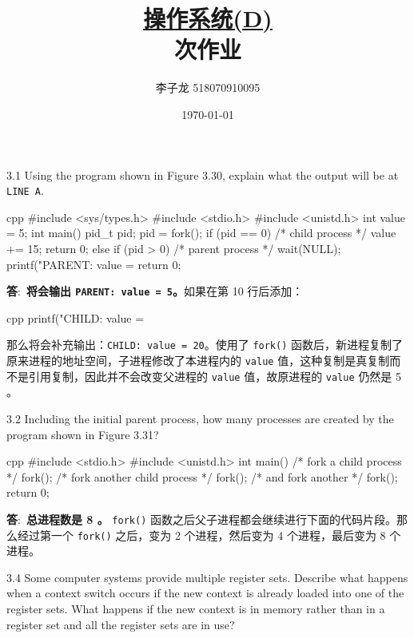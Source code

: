 \documentclass[12pt,a4paper]{article}
\newenvironment{problems}{\begin{list}{}{\renewcommand{\makelabel}[1]{\textbf{##1}\hfil}}}{\end{list}}
\providecommand{\ans}{\textbf{答}:~}
\begin{document}
\title{\normalsize \underline{操作系统(D)}\\ 次作业}
\author{李子龙 518070910095}
\date{\today}
\maketitle

\begin{problems}
    \item[3.1] Using the program shown in Figure 3.30, explain what the output will
    be at \texttt{LINE A}.
    \begin{code}{cpp}
#include <sys/types.h>
#include <stdio.h>
#include <unistd.h>
int value = 5;
int main()
{
    pid_t pid;
    pid = fork();
    if (pid == 0) { /* child process */
        value += 15;
        return 0;
    }
    else if (pid > 0) { /* parent process */
        wait(NULL);
        printf("PARENT: value = %
        return 0;
    }
}
    \end{code}

    \ans \textbf{将会输出 \texttt{PARENT: value = 5}。}如果在第 10 行后添加：
\begin{code}{cpp}
    printf("CHILD: value = %
\end{code}
    那么将会补充输出：\texttt{CHILD: value = 20}。使用了 \texttt{fork()} 函数后，新进程复制了原来进程的地址空间，子进程修改了本进程内的 \texttt{value} 值，这种复制是真复制而不是引用复制，因此并不会改变父进程的 \texttt{value} 值，故原进程的 \texttt{value} 仍然是 5 。
    \item[3.2] Including the initial parent process, how many processes are created by
    the program shown in Figure 3.31?
    \begin{code}{cpp}
#include <stdio.h>
#include <unistd.h>
int main()
{
    /* fork a child process */
    fork();
    /* fork another child process */
    fork();
    /* and fork another */
    fork();
    return 0;
}
    \end{code}

    \ans \textbf{总进程数是 8 。} \texttt{fork()} 函数之后父子进程都会继续进行下面的代码片段。那么经过第一个 \texttt{fork()} 之后，变为 2 个进程，然后变为 4 个进程，最后变为 8 个进程。
    \item[3.4] Some computer systems provide multiple register sets. Describe what
    happens when a context switch occurs if the new context is already loaded into one of the register sets. What happens if the new context
    is in memory rather than in a register set and all the register sets are in
    use?


\end{problems}
\end{document}
